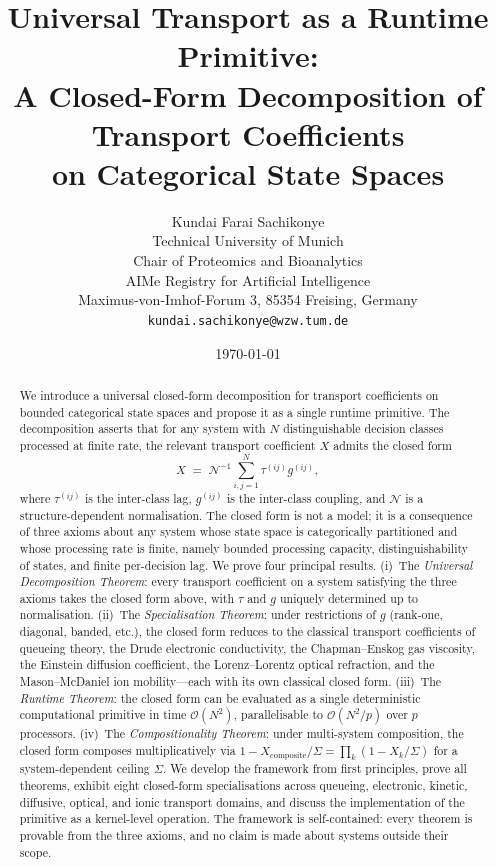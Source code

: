 \documentclass[twocolumn,11pt,a4paper]{article}
\title{\textbf{Universal Transport as a Runtime Primitive:\\[3pt]
A Closed-Form Decomposition of Transport Coefficients\\[2pt]
on Categorical State Spaces}}
\author{Kundai Farai Sachikonye\\
Technical University of Munich\\
Chair of Proteomics and Bioanalytics\\
AIMe Registry for Artificial Intelligence\\
Maximus-von-Imhof-Forum 3, 85354 Freising, Germany\\
\texttt{kundai.sachikonye@wzw.tum.de}}
\date{\today}
\newcommand{\TP}{X}
\newcommand{\Norm}{\mathcal{N}}
\newcommand{\lag}{\tau}
\newcommand{\cpl}{g}
\newcommand{\classcount}{N}
\begin{document}
\maketitle

\begin{abstract}
We introduce a universal closed-form decomposition for transport coefficients on bounded categorical state spaces and propose it as a single runtime primitive. The decomposition asserts that for any system with $\classcount$ distinguishable decision classes processed at finite rate, the relevant transport coefficient $\TP$ admits the closed form
\[
\TP \;=\; \Norm^{-1} \sum_{i,j=1}^{\classcount} \lag^{(ij)} \cpl^{(ij)},
\]
where $\lag^{(ij)}$ is the inter-class lag, $\cpl^{(ij)}$ is the inter-class coupling, and $\Norm$ is a structure-dependent normalisation. The closed form is not a model; it is a consequence of three axioms about any system whose state space is categorically partitioned and whose processing rate is finite, namely bounded processing capacity, distinguishability of states, and finite per-decision lag. We prove four principal results. (i)~The \emph{Universal Decomposition Theorem}: every transport coefficient on a system satisfying the three axioms takes the closed form above, with $\lag$ and $\cpl$ uniquely determined up to normalisation. (ii)~The \emph{Specialisation Theorem}: under restrictions of $\cpl$ (rank-one, diagonal, banded, etc.), the closed form reduces to the classical transport coefficients of queueing theory, the Drude electronic conductivity, the Chapman--Enskog gas viscosity, the Einstein diffusion coefficient, the Lorenz--Lorentz optical refraction, and the Mason--McDaniel ion mobility---each with its own classical closed form. (iii)~The \emph{Runtime Theorem}: the closed form can be evaluated as a single deterministic computational primitive in time $\mathcal{O}(\classcount^2)$, parallelisable to $\mathcal{O}(\classcount^2 / p)$ over $p$ processors. (iv)~The \emph{Compositionality Theorem}: under multi-system composition, the closed form composes multiplicatively via $1 - \TP_{\mathrm{composite}}/\Sigma = \prod_k (1 - \TP_k/\Sigma)$ for a system-dependent ceiling $\Sigma$. We develop the framework from first principles, prove all theorems, exhibit eight closed-form specialisations across queueing, electronic, kinetic, diffusive, optical, and ionic transport domains, and discuss the implementation of the primitive as a kernel-level operation. The framework is self-contained: every theorem is provable from the three axioms, and no claim is made about systems outside their scope.
\end{abstract}
\end{document}
